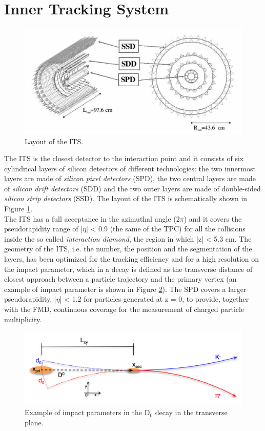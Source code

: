 \section{Inner Tracking System}
\label{sec:ITS}
\begin{figure}
  \centering
  \includegraphics[scale=0.30]{figures/ITS.png}
  \caption{Layout of the ITS.}
  \label{fig:ITS}
\end{figure}
%
The ITS is the closest detector to the interaction point and it consists of six cylindrical layers of silicon detectors of different technologies: the two innermost layers are made of \textit{silicon pixel detectors} (SPD), the two central layers are made of \textit{silicon drift detectors} (SDD) and the two outer layers are made of double-sided \textit{silicon strip detectors} (SSD). The layout of the ITS is schematically shown in Figure \ref{fig:ITS}.\\
The ITS has a full acceptance in the azimuthal angle (2$\pi$) and it covers the pseudorapidity range of |$\eta$| < 0.9 (the same of the TPC) for all the collisions inside the so called \textit{interaction diamond}, the region in which |z| < 5.3 cm. The geometry of the ITS, i.e. the number, the position and the segmentation of the layers, has been optimized for the tracking efficiency and for a high resolution on the impact parameter, which in a decay is defined as the transverse distance of closest approach between a particle trajectory and the primary vertex (an example of impact parameter is shown in Figure \ref{fig:parametro}). The SPD covers a larger pseudorapidity, |$\eta$| < 1.2 for particles generated at z = 0, to provide, together with the FMD, continuous coverage for the measurement of charged particle multiplicity.\\
\begin{figure}
  \centering
  \includegraphics[scale=0.40]{figures/parametro.png}
  \caption{Example of impact parameters in the D$_0$ decay in the transverse plane.}
  \label{fig:parametro}
\end{figure}
